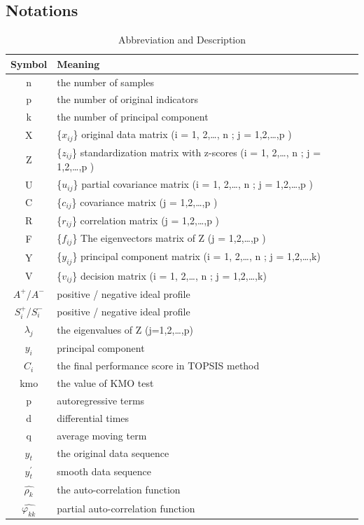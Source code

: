 \documentclass{mcmthesis}
\begin{document}
    \subsection{Notations}
         \begin{table}[!htbp]
                \begin{tabular}{c|l}
                  \hline
                  Symbol & Meaning \\
                  \hline
                  n & the number of samples \\
                  p & the number of original indicators \\
                  k & the number of principal component \\
                  X & \{$x_{ij}$\} original data matrix (i = 1, 2,…, n ; j = 1,2,…,p ) \\
                  Z & \{$z_{ij}$\} standardization matrix with z-scores (i = 1, 2,…, n ; j = 1,2,…,p ) \\
                  U & \{$u_{ij}$\} partial covariance matrix (i = 1, 2,…, n ; j = 1,2,…,p ) \\
                  C & \{$c_{ij}$\} covariance matrix (j = 1,2,…,p ) \\
                  R & \{$r_{ij}$\} correlation matrix (j = 1,2,…,p ) \\
                  F & \{$f_{ij}$\} The eigenvectors matrix of Z (j = 1,2,…,p ) \\
                  Y & \{$y_{ij}$\} principal component matrix (i = 1, 2,…, n ; j = 1,2,…,k) \\
                  V & \{$v_{ij}$\} decision matrix (i = 1, 2,…, n ; j = 1,2,…,k) \\
                  $A^+$/$A^-$ & positive / negative ideal profile \\
                  $S_{i}^+$/$S_{i}^-$ & positive / negative ideal profile \\
                  $\lambda_{j}$ & the eigenvalues of Z (j=1,2,…,p) \\
                  $y_{i}$ & principal component \\
                  $C_{i}$ & the final performance score in TOPSIS method \\
                  kmo & the value of KMO test \\
                  p & autoregressive terms \\
                  d & differential times \\
                  q & average moving term \\
                  $y_{t}$ & the original data sequence \\
                  $y_{t}^{'}$ & smooth data sequence \\
                  $\hat{\rho_{k}}$ & the auto-correlation function \\
                  $\hat{\varphi_{kk}}$ & partial auto-correlation function \\
                  \hline
                \end{tabular}
           \caption{Abbreviation and Description}
         \end{table}
\end{document}
